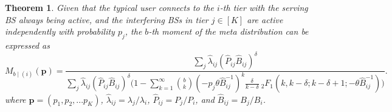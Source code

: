 \documentclass[12pt,draftclsnofoot,journal,onecolumn]{IEEEtran}
\def\E{\mathbb{E}}
\def\P{\mathbb{P}}
\def\dd{\mathrm{d}}
\def\eqa{\stackrel{{\rm (a)}}{=}}
\def\eqb{\stackrel{{\rm (b)}}{=}}
\newtheorem{theorem}{Theorem}
\begin{document}
\begin{theorem}
	\label{thm:Mb-ith-tier_BSActivity}
	Given that the typical user connects to the $i$-th tier with the serving BS always being active, and the interfering BSs in tier $j\in[K]$ are active independently with probability $p_j$, the $b$-th moment of the meta distribution can be expressed as
	\begin{equation}\label{eq:Mb-ith-tier-BSActivity}
	M_{b \mid (i)}(\bm p) = \frac{\sum_{j} \hat{\lambda}_{ij}(\hat{P}_{ij}\hat{B}_{ij})^\delta}{\sum\limits_j \hat{\lambda}_{ij}(\hat{P}_{ij}\hat{B}_{ij})^\delta \big(1-\sum\limits_{k=1}^{\infty}\binom bk (-p_j \theta \hat B_{ij}^{-1})^k \frac{\delta}{k-\delta} ~_2F_1(k,k-\delta; k-\delta+1; -\theta \hat B_{ij}^{-1})\big)}.
	\end{equation}
	where $\bm p=(p_1,p_2,...p_K)$, $\hat\lambda_{ij} = \lambda_j/\lambda_i$, $\hat P_{ij} = P_j/P_i$, and $\hat B_{ij} = B_j/B_i$.
\end{theorem}
\end{document}
